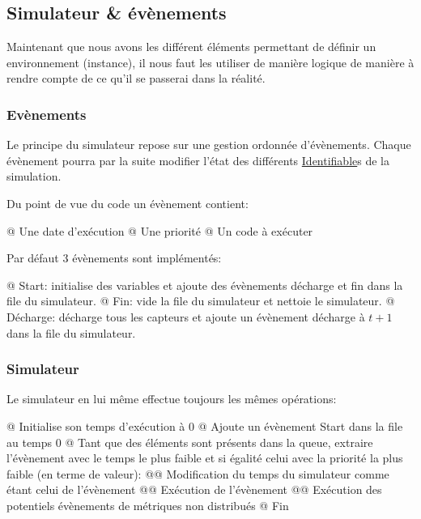 \documentclass[final]{polytech/polytech}
\newcommand{\klass}[1]{\hyperref[class:#1]{#1}}
\begin{document}
			\subsection{Simulateur \& évènements}
				Maintenant que nous avons les différent éléments permettant de définir un environnement (instance), il nous faut les utiliser de manière logique de manière à rendre compte de ce qu'il se passerai dans la réalité.
				
				\subsubsection{Evènements}
					Le principe du simulateur repose sur une gestion ordonnée d'évènements.
					Chaque évènement pourra par la suite modifier l'état des différents \klass{Identifiable}s de la simulation.
				
					Du point de vue du code un évènement contient:
					\begin{easylist}
						@ Une date d'exécution
						@ Une priorité
						@ Un code à exécuter	
					\end{easylist}
					
					Par défaut 3 évènements sont implémentés:
					\begin{easylist}
						@ Start: initialise des variables et ajoute des évènements décharge et fin dans la file du simulateur.
						@ Fin: vide la file du simulateur et nettoie le simulateur.
						@ Décharge: décharge tous les capteurs et ajoute un évènement décharge à $t+1$ dans la file du simulateur.
					\end{easylist}
					
				\subsubsection{Simulateur}
					Le simulateur en lui même effectue toujours les mêmes opérations:
					\begin{easylist}
						@ Initialise son temps d'exécution à 0
						@ Ajoute un évènement Start dans la file au temps 0
						@ Tant que des éléments sont présents dans la queue, extraire l'évènement avec le temps le plus faible et si égalité celui avec la priorité la plus faible (en terme de valeur):
						@@ Modification du temps du simulateur comme étant celui de l'évènement
						@@ Exécution de l'évènement
						@@ Exécution des potentiels évènements de métriques non distribués
						@ Fin
					\end{easylist}
					
\end{document}
